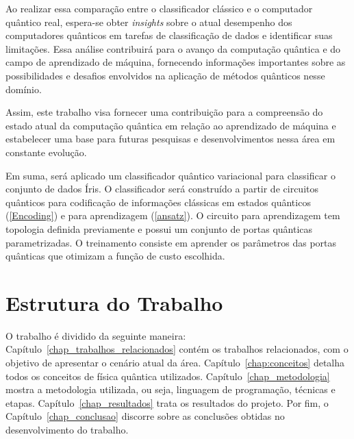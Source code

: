 Ao realizar essa comparação entre o classificador clássico e o computador quântico real, espera-se obter \textit{insights} sobre o atual desempenho dos computadores quânticos em tarefas de classificação de dados e identificar suas limitações. Essa análise contribuirá para o avanço da computação quântica e do campo de aprendizado de máquina, fornecendo informações importantes sobre as possibilidades e desafios envolvidos na aplicação de métodos quânticos nesse domínio.

Assim, este trabalho visa fornecer uma contribuição para a compreensão do estado atual da computação quântica em relação ao aprendizado de máquina e estabelecer uma base para futuras pesquisas e desenvolvimentos nessa área em constante evolução.

Em suma, será aplicado um classificador quântico variacional \cite{Havlicek2019qSupervisedLearning} para classificar o conjunto de dados Íris. O classificador será construído a partir de circuitos quânticos para codificação de informações clássicas em estados quânticos (\ref{Encoding}) e para aprendizagem (\ref{ansatz}). O circuito para aprendizagem tem topologia definida previamente e possui um conjunto de portas quânticas parametrizadas. O treinamento consiste em aprender os parâmetros das portas quânticas que otimizam a função de custo escolhida.

\section{Estrutura do Trabalho} \label{sec2}

O trabalho é dividido da seguinte maneira: Capítulo~\ref{chap_trabalhos_relacionados} contém os trabalhos relacionados, com o objetivo de apresentar o cenário atual da área. Capítulo~\ref{chap:conceitos} detalha todos os conceitos de física quântica utilizados. Capítulo~\ref{chap_metodologia} mostra a metodologia utilizada, ou seja, linguagem de programação, técnicas e etapas. Capítulo~\ref{chap_resultados} trata os resultados do projeto. Por fim, o Capítulo~\ref{chap_conclusao} discorre sobre as conclusões obtidas no desenvolvimento do trabalho.